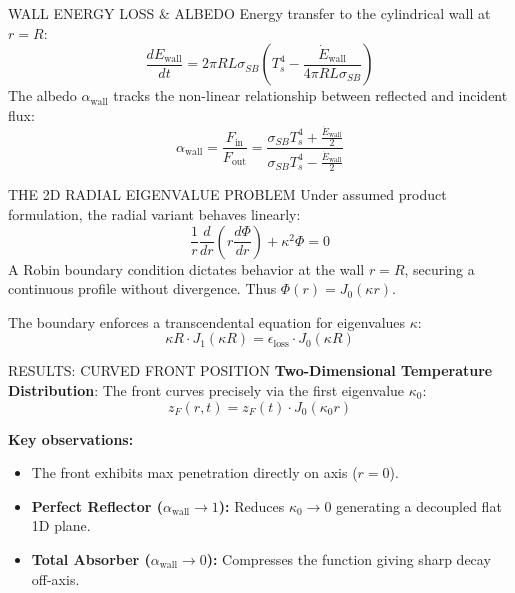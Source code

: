 \documentclass{beamer}
\begin{document}
\begin{frame}{WALL ENERGY LOSS \& ALBEDO}
  Energy transfer to the cylindrical wall at $r=R$:
  \begin{equation}
    \frac{dE_{\text{wall}}}{dt} = 2\pi R L \sigma_{SB} \left(T_s^4 - \frac{\dot{E}_{\text{wall}}}{4\pi R L \sigma_{SB}}\right)
  \end{equation}
  The albedo $\alpha_{\text{wall}}$ tracks the non-linear relationship between reflected and incident flux:
  \begin{equation}
    \alpha_{\text{wall}} = \frac{F_{\text{in}}}{F_{\text{out}}} = \frac{\sigma_{SB}T_s^4 + \frac{\dot{E}_{\text{wall}}}{2}}{\sigma_{SB}T_s^4 - \frac{\dot{E}_{\text{wall}}}{2}}
  \end{equation}
\end{frame}

\begin{frame}{THE 2D RADIAL EIGENVALUE PROBLEM}
  Under assumed product formulation, the radial variant behaves linearly:
  \begin{equation}
    \frac{1}{r}\frac{d}{dr}\left(r\frac{d\Phi}{dr}\right) + \kappa^2 \Phi = 0
  \end{equation}
  A Robin boundary condition dictates behavior at the wall $r=R$, securing a continuous profile without divergence. Thus $\Phi(r) = J_0(\kappa r)$. 
  \vspace{10pt}

  The boundary enforces a transcendental equation for eigenvalues $\kappa$:
  \begin{equation}
    \kappa R \cdot J_1(\kappa R) = \epsilon_{\text{loss}} \cdot J_0(\kappa R)
  \end{equation}
\end{frame}

\begin{frame}{RESULTS: CURVED FRONT POSITION}
  \textbf{Two-Dimensional Temperature Distribution}:
  The front curves precisely via the first eigenvalue $\kappa_0$:
  \begin{equation}
    z_F(r,t) = z_F(t) \cdot J_0(\kappa_0 r)
  \end{equation}
  
  \textbf{Key observations:}
  \begin{itemize}
      \item The front exhibits max penetration directly on axis ($r=0$).
      \item \textbf{Perfect Reflector ($\alpha_{\text{wall}} \to 1$):} Reduces $\kappa_0 \to 0$ generating a decoupled flat 1D plane. 
      \item \textbf{Total Absorber ($\alpha_{\text{wall}} \to 0$):} Compresses the function giving sharp decay off-axis.
  \end{itemize}
\end{frame}
\end{document}
